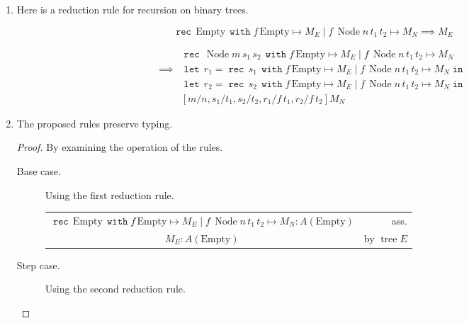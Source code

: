 \documentclass[11pt,letterpaper]{article}
\DeclareMathOperator{\opNode}{Node}
\DeclareMathOperator{\opTree}{tree}
\DeclareMathOperator{\opRec}{\mathtt{rec}}
\DeclareMathOperator{\opLet}{\mathtt{let}}
\DeclareMathOperator{\opIn}{\mathtt{in}}
\DeclareMathOperator{\opWith}{\mathtt{with}}
\newcommand{\emptyTree}{\mathrm{Empty}}
\newcommand{\nodeTree}[3]{\opNode{#1\,#2\,#3}}
\newcommand{\tree}{\opTree{}}
\newcommand{\with}{\opWith{}}
\newcommand{\case}[3]{#1\,#2\mapsto #3}
\newcommand{\orCase}{\mid}
\newcommand{\rec}[1]{\opRec{\,#1\,}}
\newcommand{\reducesTo}{\implies}
\newcommand{\olet}{\opLet{}\,}
\newcommand{\oin}{\opIn{}\,}
\begin{document}
\begin{enumerate}
    \item Here is a reduction rule for recursion on binary trees.

        \begin{equation*}
            \rec{\emptyTree}
            \with \case{f}{\emptyTree}{M_E}
            \orCase \case{f}{\nodeTree{n}{t_1}{t_2}}{M_N} \reducesTo M_E
        \end{equation*}

        \begin{align*}
            &\rec{\nodeTree{m}{s_1}{s_2}}
            \with \case{f}{\emptyTree}{M_E}
            \orCase \case{f}{\nodeTree{n}{t_1}{t_2}}{M_N} \\
            \reducesTo
            &\olet r_1 = \rec{s_1}
                \with \case{f}{\emptyTree}{M_E}
                \orCase \case{f}{\nodeTree{n}{t_1}{t_2}}{M_N} \oin \\
            &\olet r_2 = \rec{s_2}
                \with \case{f}{\emptyTree}{M_E}
                \orCase \case{f}{\nodeTree{n}{t_1}{t_2}}{M_N} \oin \\
            &\left[m/n, s_1/t_1, s_2/t_2, r_1/f\,t_1, r_2/f\,t_2\right]M_N
        \end{align*}

    \item The proposed rules preserve typing.

        \begin{proof} By examining the operation of the rules.
            \begin{description}
                \item[Base case.] Using the first reduction rule.

                    \begin{tabular}{c r}
                        $
                        \rec{\emptyTree}
                        \with \case{f}{\emptyTree}{M_E}
                        \orCase \case{f}{\nodeTree{n}{t_1}{t_2}}{M_N}
                        : A(\emptyTree)
                        $
                        &
                        ass. \\
                        $
                        M_E : A(\emptyTree)
                        $
                        &
                        by $\tree E$
                    \end{tabular}

                \item[Step case.] Using the second reduction rule.


\end{description}
\end{proof}
\end{enumerate}
\end{document}
